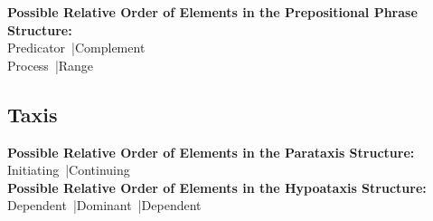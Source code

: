 \noindent\textbf{Possible Relative Order of Elements in the Prepositional Phrase Structure:} \\ \noindent
Predicator~|Complement \\ \noindent
Process~|Range \\

\subsection{Taxis}
\noindent\textbf{Possible Relative Order of Elements in the Parataxis Structure:} \\ \noindent
Initiating~|Continuing \\
\noindent\textbf{Possible Relative Order of Elements in the Hypoataxis Structure:} \\ \noindent
Dependent~|Dominant~|Dependent\\
